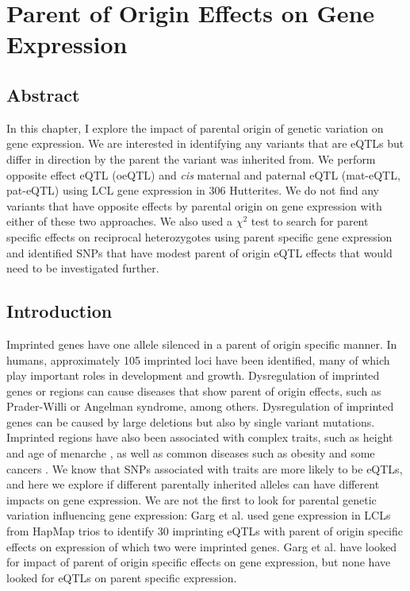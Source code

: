 
\chapter{Parent of Origin Effects on Gene Expression }\label{ch:poeqtl}
\section[Abstract]{Abstract}

In this chapter, I explore the impact of parental origin of genetic variation on gene expression. We are interested in identifying any variants that are eQTLs but differ in direction by the parent the variant was inherited from. We perform opposite effect eQTL (oeQTL) and \emph{cis} maternal and paternal eQTL (mat-eQTL, pat-eQTL) using LCL gene expression in 306 Hutterites. We do not find any variants that have opposite effects by parental origin on gene expression with either of these two approaches. We also used a $\chi^2$ test to search for parent specific effects on reciprocal heterozygotes using parent specific gene expression and identified SNPs that have modest parent of origin eQTL effects that would need to be investigated further.

\section{Introduction}\label{ch04-introduction}
Imprinted genes have one allele silenced in a parent of origin specific manner. In humans, approximately 105 imprinted loci have been identified, many of which play important roles in development and growth\cite{Falls1999,Peters2014}. Dysregulation of imprinted genes or regions can cause diseases that show parent of origin effects, such as Prader-Willi or Angelman syndrome, among others\cite{Peters2014}. Dysregulation of imprinted genes can be caused by large deletions but also by single variant mutations. Imprinted regions have also been associated with complex traits, such as height and age of menarche \cite{Benonisdottir:2016dz,Zoledziewska:2015do}, as well as common diseases such as obesity and some cancers \cite{Peters2014}. We know that SNPs associated with traits are more likely to be eQTLs\citep{Nicolae2010}, and here we explore if different parentally inherited alleles can have different impacts on gene expression. We are not the first to look for parental genetic variation influencing gene expression: Garg et al. used gene expression in LCLs from HapMap trios to identify 30 imprinting eQTLs with parent of origin specific effects on expression of which two were imprinted genes\cite{Garg2012a}. Garg et al. have looked for impact of parent of origin specific effects on gene expression\citep{Garg2012a}, but none have looked for eQTLs on parent specific expression. 
	
